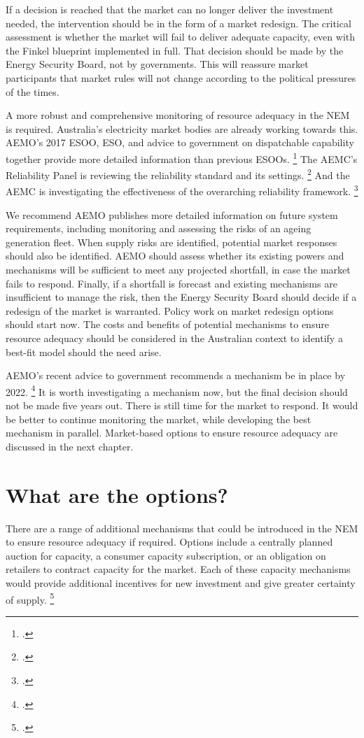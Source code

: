 \documentclass[FrontPage]{grattan}
\begin{document}
If a decision is reached that the market can no longer deliver the investment needed, the intervention should be in the form of a market redesign. The critical assessment is whether the market will fail to deliver adequate capacity, even with the Finkel blueprint implemented in full. That decision should be made by the Energy Security Board, not by governments. This will reassure market participants that market rules will not change according to the political pressures of the times.

A more robust and comprehensive monitoring of resource adequacy in the NEM is required. Australia’s electricity market bodies are already working towards this. AEMO's 2017 ESOO, ESO, and advice to government on dispatchable capability together provide more detailed information than previous ESOOs.%
\footcites{AEMO2017ESOO}{AEMO2017ESO}{AEMO2017AdviceDispatchableCapacity}
The AEMC's Reliability Panel is reviewing the reliability standard and its settings.%
\footcite{AEMC2017ReliabilityStandardSettingsReview}
And the AEMC is investigating the effectiveness of the overarching reliability framework.%
\footcite{AEMC2017ReliabilityFrameworksIssuesPaper}

We recommend AEMO publishes more detailed information on future system requirements, including monitoring and assessing the risks of an ageing generation fleet. When supply risks are identified, potential market responses should also be identified. AEMO should assess whether its existing powers and mechanisms will be sufficient to meet any projected shortfall, in case the market fails to respond. Finally, if a shortfall is forecast and existing mechanisms are insufficient to manage the risk, then the Energy Security Board should decide if a redesign of the market is warranted.
Policy work on market redesign options should start now. The costs and benefits of potential mechanisms to ensure resource adequacy should be considered in the Australian context to identify a best-fit model should the need arise.

AEMO's recent advice to government recommends a mechanism be in place by 2022.%
\footcite{AEMO2017AdviceDispatchableCapacity}
It is worth investigating a mechanism now, but the final decision should not be made five years out. There is still time for the market to respond. It would be better to continue monitoring the market, while developing the best mechanism in parallel. Market-based options to ensure resource adequacy are discussed in the next chapter.


\chapter{What are the options?}\label{chap:what-are-the-options}
There are a range of additional mechanisms that could be introduced in the NEM to ensure resource adequacy if required. Options include a centrally planned auction for capacity, a consumer capacity subscription, or an obligation on retailers to contract capacity for the market. Each of these capacity mechanisms would provide additional incentives for new investment and give greater certainty of supply.%
\footcite[][15]{CIGRE2016CapacityMechanisms}
\end{document}
